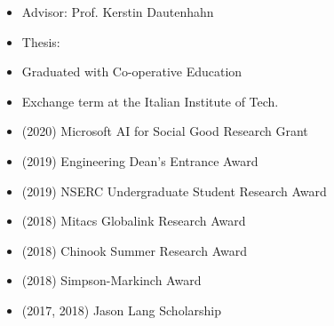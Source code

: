 \documentclass[10pt,a4paper,normalphoto]{altacv}
\begin{document}
\begin{paracol}{2}
\vspace{-5px}
\begin{itemize}
    \item Advisor: Prof. Kerstin Dautenhahn
    \item Thesis:  \href{https://uwspace.uwaterloo.ca/handle/10012/17462}{\faLink}
\end{itemize}

\vspace{1px}

\vspace{-5px}
\begin{itemize}
    \item Graduated with Co-operative Education
    \item Exchange term at the Italian Institute of Tech. \href{https://www.ulethbridge.ca/unews/article/mitacs-award-winner-takes-studies-overseas-italy}{\faLink}
\end{itemize}



\begin{itemize} %
    \item (2020) Microsoft AI for Social Good Research Grant
    \item (2019) Engineering Dean's Entrance Award
    \item (2019) NSERC Undergraduate Student Research Award
    \item (2018) Mitacs Globalink Research Award
    \item (2018) Chinook Summer Research Award
    \item (2018) Simpson-Markinch Award
    \item (2017, 2018) Jason Lang Scholarship
\end{itemize}




\end{paracol}
\end{document}
